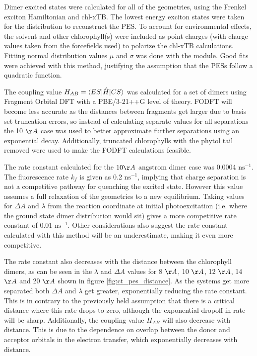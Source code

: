 Dimer excited states were calculated for all of the geometries, using the Frenkel
exciton Hamiltonian and chl-xTB. The lowest energy exciton states were taken for 
the distribution to reconstruct the PES. To account for environmental effects, the
solvent and other chlorophyll(s) were included as point charges (with charge values 
taken from the forcefields used) to polarize the chl-xTB calculations. Fitting normal
distribution values $\mu$ and $\sigma$ was done with the  module.
Good fits were achieved with this method, justifying the assumption that the PESs
follow a quadratic function.

The coupling value $H_{AB} = \braket{ES|\hat{H}|CS}$ was calculated for a set of
dimers using Fragment Orbital DFT with a PBE/3-21++G level of theory. FODFT will
become less accurate as the distances between fragments get larger due to basis
set truncation errors, so instead of calculating separate values for all separations
the 10 $\AA{}$ case was used to better approximate further separations using an
exponential decay. Additionally, truncated chlorophylls with the phytol tail removed
were used to make the FODFT calculations feasible.

The rate constant calculated for the $10\AA{}$ angstrom dimer case was 0.0004 $\text{ns}^{-1}$.
The fluorescence rate $k_f$ is given as 0.2 $\text{ns}^{-1}$, implying that charge
separation is not a competitive pathway for quenching the excited state. However
this value assumes a full relaxation of the geometries to a new equilibrium. Taking
values for $\Delta A$ and $\lambda$ from the reaction coordinate at initial photoexcitation 
(i.e. where the ground state dimer distribution would sit) gives a more competitive 
rate constant of 0.01 $\text{ns}^{-1}$. Other considerations also suggest the rate
constant calculated with this method will be an underestimate, making it even more competitive.

The rate constant also decreases with the distance between the chlorophyll dimers, as can
be seen in the $\lambda$ and $\Delta A$ values for 8 $\AA{}$, 10 $\AA{}$, 12 $\AA{}$,
14 $\AA{}$ and 20 $\AA{}$ shown in figure \ref{fig:ct_pes_distance}. As the systems
get more separated both $\Delta A$ and $\lambda$ get greater, exponentially reducing 
the rate constant. This is in contrary to the previously held assumption that there 
is a critical distance where this rate drops to zero, although the exponential dropoff 
in rate will be sharp. Additionally, the coupling value $H_{AB}$ will also decrease 
with distance. This is due to the dependence on overlap between the donor and acceptor 
orbitals in the electron transfer, which exponentially decreases with distance.

